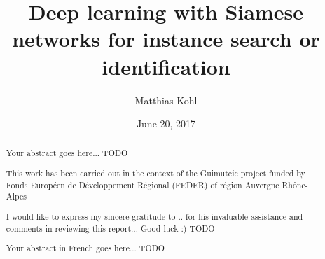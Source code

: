 \documentclass[12pt, a4paper]{memoir} %
\title{Deep learning with Siamese networks for instance search or identification} %
\author{Matthias Kohl}
\date{June 20, 2017} %
\begin{document}
\frontmatter
\begin{titlingpage}
\maketitle
\end{titlingpage}

\setlength{\parskip}{-1pt plus 1pt}

\renewcommand{\abstracttextfont}{\normalfont}
\abstractintoc
\begin{abstract}
Your abstract goes here... TODO
\end{abstract}
\abstractintoc

\renewcommand\abstractname{Acknowledgement}
\begin{abstract}
This work has been carried out in the context of the Guimuteic project
funded by Fonds Européen de Développement Régional (FEDER) of région
Auvergne Rhône-Alpes


I would like to express my sincere gratitude to .. for his invaluable assistance and comments in reviewing this report...
Good luck :)
TODO
\end{abstract}


\renewcommand\abstractname{R\'esum\'e}
\begin{abstract} 
Your abstract in French goes here... TODO
\end{abstract}

\cleardoublepage

\tableofcontents* %
\normalsize

\mainmatter
\SingleSpace









\backmatter



\end{document}
